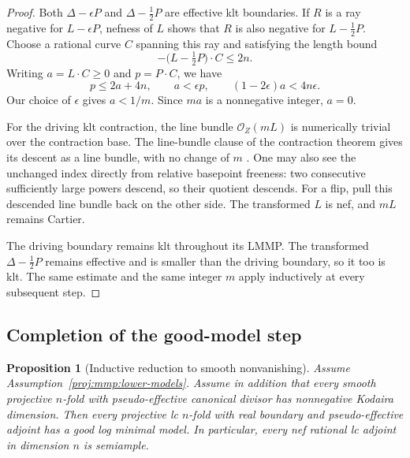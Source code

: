 \documentclass[11pt,letterpaper]{article}
\newtheorem{proposition}[theorem]{Proposition}
\theoremstyle{definition}
\theoremstyle{remark}
\begin{document}
\begin{proof}
Both \(\Delta-\epsilon P\) and \(\Delta-\tfrac12P\) are
effective klt boundaries. If \(R\) is a ray negative for
\(L-\epsilon P\), nefness of \(L\) shows that \(R\) is also
negative for \(L-\tfrac12P\).
Choose a rational curve \(C\) spanning this ray and satisfying
the length bound
\[
 -\bigl(L-\tfrac12P\bigr)\cdot C\leq 2n.
\]
Writing \(a=L\cdot C\geq 0\) and \(p=P\cdot C\), we have
\[
 p\leq 2a+4n,\qquad a<\epsilon p,
 \qquad
 (1-2\epsilon)a<4n\epsilon.
\]
Our choice of \(\epsilon\) gives \(a<1/m\).
Since \(ma\) is a nonnegative integer, \(a=0\).

For the driving klt contraction, the line bundle
\(\mathcal{O}_Z(mL)\) is numerically trivial over the contraction base.
The line-bundle clause of the contraction theorem gives its
descent as a line bundle, with no change of \(m\)
\cite[Theorem~3.74(3)]{Proj-Fujino2017}.
One may also see the unchanged index directly from relative
basepoint freeness: two consecutive sufficiently large powers
descend, so their quotient descends.
For a flip, pull this descended line bundle back on the other
side. The transformed \(L\) is nef, and \(mL\) remains Cartier.

The driving boundary remains klt throughout its LMMP.
The transformed \(\Delta-\tfrac12P\) remains effective and
is smaller than the driving boundary, so it too is klt.
The same estimate and the same integer \(m\) apply inductively
at every subsequent step.
\end{proof}

\subsection{Completion of the good-model step}

\begin{proposition}[Inductive reduction to smooth nonvanishing]
\label{proj:prop:inductive-reduction}
Assume Assumption~\ref{proj:mmp:lower-models}. Assume in addition that
every smooth projective \(n\)-fold with pseudo-effective
canonical divisor has nonnegative Kodaira dimension.
Then every projective lc \(n\)-fold with real boundary and
pseudo-effective adjoint has a good log minimal model.
In particular, every nef rational lc adjoint in dimension \(n\)
is semiample.
\end{proposition}
\end{document}
